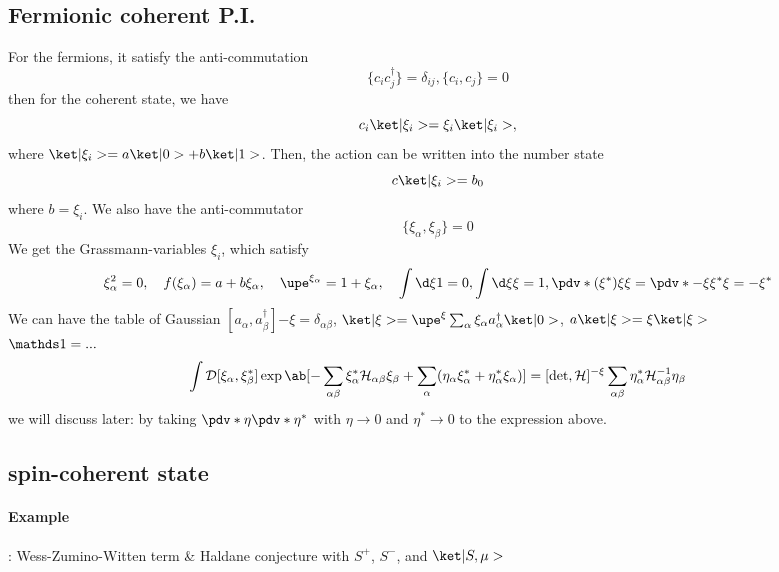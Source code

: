 \subsection{Fermionic coherent P.I.}

For the fermions, it satisfy the anti-commutation
\begin{equation}
  \{c_i c_j^\dagger\} = \delta_{ij}, \{c_i, c_j\} = 0
\end{equation}
then for the coherent state, we have
\begin{equation}
  c_i \ket|\xi_i> = \xi_i \ket|\xi_i>,
\end{equation}
where $\ket|\xi_i> = a\ket|0> + b\ket|1>$.
Then, the action can be written into the number state
\begin{equation}
  c \ket|\xi_i> = b_0
\end{equation}
where $b = \xi_i$. We also have the anti-commutator
\begin{equation}
  \{\xi_\alpha, \xi_\beta\} = 0
\end{equation}
We get the Grassmann-variables $\xi_i$, which satisfy
\begin{equation}
  \xi_\alpha^2 = 0, \quad f(\xi_\alpha) = a + b\xi_\alpha, \quad
  \upe^{\xi_\alpha} = 1 + \xi_\alpha, \quad
  \int \d\xi 1 = 0, \int \d\xi \xi = 1,
  \pdv*{(\xi^*)\xi}\xi = \pdv*{-\xi\xi^*}\xi = -\xi^*
\end{equation}
We can have the table of Gaussian
$[a_\alpha, a_\beta^\dagger]{-\xi} = \delta_{\alpha\beta}$,
$\ket|\xi> = \upe^\xi \sum_\alpha \xi_\alpha a_\alpha^\dagger\ket|0>$,
$a\ket|\xi> = \xi\ket|\xi>$\\
$\identity = ...$
\begin{equation}
  \int \mathcal D[\xi_\alpha, \xi_\beta^*]
  \exp\ab[-\sum_{\alpha\beta} \xi_\alpha^* \mathcal H_{\alpha\beta}\xi_\beta
  + \sum_\alpha(\eta_\alpha \xi_\alpha^* + \eta_\alpha^* \xi_\alpha)]
  = [\det, \mathcal H]^{-\xi} \sum_{\alpha\beta} \eta_\alpha^* \mathcal H_{\alpha\beta}^{-1} \eta_\beta
\end{equation}
we will discuss later: by taking $\pdv*{}\eta \pdv*{}{\eta^*}$ with $\eta\to 0$ and $\eta^*\to0$ to the expression above.

\subsection{spin-coherent state}

\paragraph{Example}:
Wess-Zumino-Witten term \& Haldane conjecture
with $S^+$, $S^-$, and $\ket|S, \mu>$

